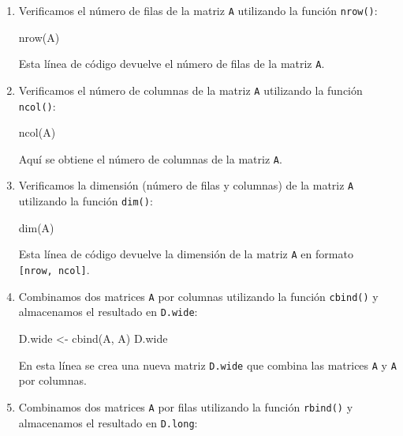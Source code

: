 \documentclass[
  jou,
  floatsintext,
  longtable,
  a4paper,
  nolmodern,
  notxfonts,
  notimes,
  12pt,
  colorlinks=true,linkcolor=blue,citecolor=blue,urlcolor=blue]{apa7}
\newenvironment{Shaded}{\begin{snugshade}}{\end{snugshade}}
\newcommand{\FunctionTok}[1]{\textcolor[rgb]{0.28,0.35,0.67}{#1}}
\newcommand{\NormalTok}[1]{\textcolor[rgb]{0.00,0.23,0.31}{#1}}
\newcommand{\OtherTok}[1]{\textcolor[rgb]{0.00,0.23,0.31}{#1}}
\begin{document}
\begin{enumerate}
\def\labelenumi{\arabic{enumi}.}
\item
  Verificamos el número de filas de la matriz \texttt{A} utilizando la
  función \texttt{nrow()}:

\begin{Shaded}
\begin{Highlighting}[]
\FunctionTok{nrow}\NormalTok{(A)}
\end{Highlighting}
\end{Shaded}

  Esta línea de código devuelve el número de filas de la matriz
  \texttt{A}.
\item
  Verificamos el número de columnas de la matriz \texttt{A} utilizando
  la función \texttt{ncol()}:

\begin{Shaded}
\begin{Highlighting}[]
\FunctionTok{ncol}\NormalTok{(A)}
\end{Highlighting}
\end{Shaded}

  Aquí se obtiene el número de columnas de la matriz \texttt{A}.
\item
  Verificamos la dimensión (número de filas y columnas) de la matriz
  \texttt{A} utilizando la función \texttt{dim()}:

\begin{Shaded}
\begin{Highlighting}[]
\FunctionTok{dim}\NormalTok{(A)}
\end{Highlighting}
\end{Shaded}

  Esta línea de código devuelve la dimensión de la matriz \texttt{A} en
  formato \texttt{{[}nrow,\ ncol{]}}.
\item
  Combinamos dos matrices \texttt{A} por columnas utilizando la función
  \texttt{cbind()} y almacenamos el resultado en \texttt{D.wide}:

\begin{Shaded}
\begin{Highlighting}[]
\NormalTok{D.wide }\OtherTok{\textless{}{-}} \FunctionTok{cbind}\NormalTok{(A, A)}
\NormalTok{D.wide}
\end{Highlighting}
\end{Shaded}

  En esta línea se crea una nueva matriz \texttt{D.wide} que combina las
  matrices \texttt{A} y \texttt{A} por columnas.
\item
  Combinamos dos matrices \texttt{A} por filas utilizando la función
  \texttt{rbind()} y almacenamos el resultado en \texttt{D.long}:


\end{enumerate}
\end{document}
